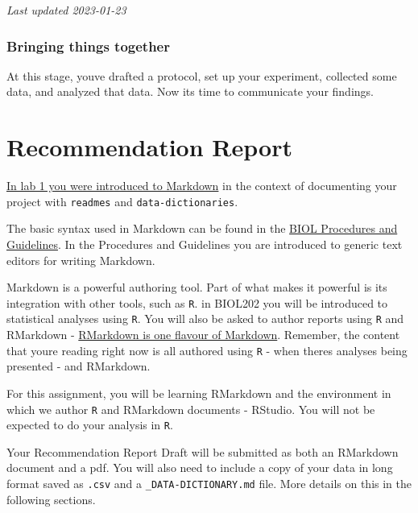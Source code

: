 \documentclass[
]{book}
\begin{document}
\emph{Last updated 2023-01-23}

\hypertarget{bringing-things-together}{%
\subsection*{Bringing things together}\label{bringing-things-together}}

At this stage, you\textquotesingle ve drafted a protocol, set up your experiment, collected some data, and analyzed that data. Now it\textquotesingle s time to communicate your findings.

\hypertarget{recommendation-report}{%
\chapter*{Recommendation Report}\label{recommendation-report}}

\href{https://ubco-biology.github.io/Procedures-and-Guidelines/readme-files-and-data-dictionaries.html\#markdown}{In lab 1 you were introduced to Markdown} in the context of documenting your project with \texttt{readmes} and \texttt{data-dictionaries}.

The basic syntax used in Markdown can be found in the \href{https://ubco-biology.github.io/Procedures-and-Guidelines/markdown-1.html}{BIOL Procedures and Guidelines}. In the Procedures and Guidelines you are introduced to generic text editors for writing Markdown.

Markdown is a powerful authoring tool. Part of what makes it powerful is it\textquotesingle s integration with other tools, such as \texttt{R}. in BIOL202 you will be introduced to statistical analyses using \texttt{R}. You will also be asked to author reports using \texttt{R} and RMarkdown - \href{https://ubco-biology.github.io/Procedures-and-Guidelines/markdown-flavours.html}{RMarkdown is one flavour of Markdown}. Remember, the content that you\textquotesingle re reading right now is all authored using \texttt{R} - when there\textquotesingle s analyses being presented - and RMarkdown.

For this assignment, you will be learning RMarkdown and the environment in which we author \texttt{R} and RMarkdown documents - RStudio. You will not be expected to do your analysis in \texttt{R}.

Your Recommendation Report Draft will be submitted as both an RMarkdown document and a pdf. You will also need to include a copy of your data in long format saved as \texttt{.csv} and a \texttt{\_DATA-DICTIONARY.md} file. More details on this in the following sections.
\end{document}
